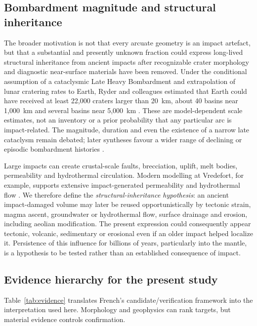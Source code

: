 \documentclass[11pt]{article}
\begin{document}
\subsection{Bombardment magnitude and structural inheritance}
The broader motivation is not that every arcuate geometry is an impact artefact, but that a substantial and presently unknown fraction could express long-lived structural inheritance from ancient impacts after recognizable crater morphology and diagnostic near-surface materials have been removed. Under the conditional assumption of a cataclysmic Late Heavy Bombardment and extrapolation of lunar cratering rates to Earth, Ryder and colleagues estimated that Earth could have received at least 22,000 craters larger than 20~km, about 40 basins near 1,000~km and several basins near 5,000~km \cite{Ryder2002,RyderKoeberlMojzsis2000}. These are model-dependent scale estimates, not an inventory or a prior probability that any particular arc is impact-related. The magnitude, duration and even the existence of a narrow late cataclysm remain debated; later syntheses favour a wider range of declining or episodic bombardment histories \cite{FassettMinton2013}.

Large impacts can create crustal-scale faults, brecciation, uplift, melt bodies, permeability and hydrothermal circulation. Modern modelling at Vredefort, for example, supports extensive impact-generated permeability and hydrothermal flow \cite{Marchi2024}. We therefore define the \emph{structural-inheritance hypothesis}: an ancient impact-damaged volume may later be reused opportunistically by tectonic strain, magma ascent, groundwater or hydrothermal flow, surface drainage and erosion, including aeolian modification. The present expression could consequently appear tectonic, volcanic, sedimentary or erosional even if an older impact helped localize it. Persistence of this influence for billions of years, particularly into the mantle, is a hypothesis to be tested rather than an established consequence of impact.

\subsection{Evidence hierarchy for the present study}
Table~\ref{tab:evidence} translates French's candidate/verification framework into the interpretation used here. Morphology and geophysics can rank targets, but material evidence controls confirmation.
\end{document}

